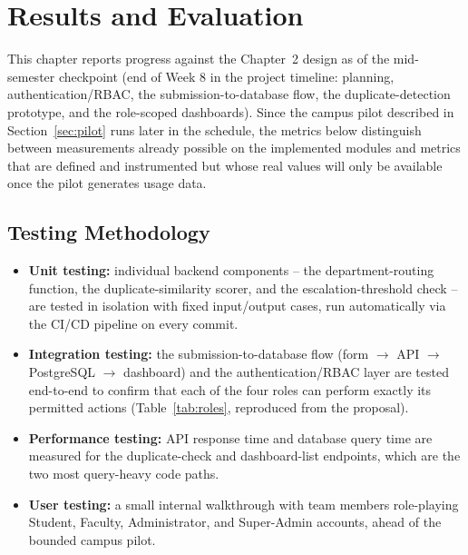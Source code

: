 \documentclass[11pt]{report}
\begin{document}
\chapter{Results and Evaluation}

This chapter reports progress against the Chapter~2 design as of the
mid-semester checkpoint (end of Week 8 in the project timeline: planning,
authentication/RBAC, the submission-to-database flow, the
duplicate-detection prototype, and the role-scoped dashboards). Since the
campus pilot described in Section~\ref{sec:pilot} runs later in the
schedule, the metrics below distinguish between measurements already
possible on the implemented modules and metrics that are defined and
instrumented but whose real values will only be available once the
pilot generates usage data.

\section{Testing Methodology}

\begin{itemize}
  \item \textbf{Unit testing:} individual backend components -- the
    department-routing function, the duplicate-similarity scorer, and
    the escalation-threshold check -- are tested in isolation with
    fixed input/output cases, run automatically via the CI/CD pipeline
    on every commit.
  \item \textbf{Integration testing:} the submission-to-database flow
    (form $\to$ API $\to$ PostgreSQL $\to$ dashboard) and the
    authentication/RBAC layer are tested end-to-end to confirm that
    each of the four roles can perform exactly its permitted actions
    (Table~\ref{tab:roles}, reproduced from the proposal).
  \item \textbf{Performance testing:} API response time and database
    query time are measured for the duplicate-check and dashboard-list
    endpoints, which are the two most query-heavy code paths.
  \item \textbf{User testing:} a small internal walkthrough with team
    members role-playing Student, Faculty, Administrator, and
    Super-Admin accounts, ahead of the bounded campus pilot.
\end{itemize}
\end{document}
